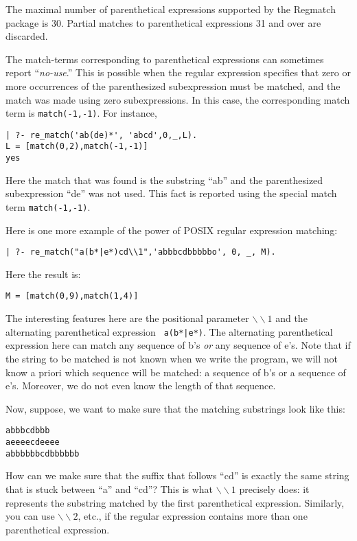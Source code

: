 The maximal number of parenthetical expressions supported by the Regmatch
package is 30. Partial matches to parenthetical expressions 31 and over are
discarded.

The match-terms corresponding to parenthetical expressions can sometimes
report ``\emph{no-use}.'' This is possible when the regular expression
specifies that zero or more occurrences of the parenthesized subexpression
must be matched, and the match was made using zero subexpressions. In this
case, the corresponding match term is \verb|match(-1,-1)|. For instance, 
\begin{verbatim}
| ?- re_match('ab(de)*', 'abcd',0,_,L).
L = [match(0,2),match(-1,-1)]
yes
\end{verbatim}
Here the match that was found is the substring ``ab'' and the parenthesized
subexpression ``de'' was not used. This fact is reported using the special
match term \verb|match(-1,-1)|.

Here is one more example of the power of POSIX regular expression matching:
\begin{verbatim}
| ?- re_match("a(b*|e*)cd\\1",'abbbcdbbbbbo', 0, _, M).  
\end{verbatim}
Here the result is:
\begin{verbatim}
M = [match(0,9),match(1,4)]
\end{verbatim}
The interesting features here are the positional parameter
$\backslash\backslash 1$ and the alternating parenthetical expression {\tt
a(b*|e*)}. The alternating parenthetical expression here can match any
sequence of b's \emph{or} any sequence of e's. Note that if the string to
be matched is not known when we write the program, we will not know a
priori which sequence will be matched: a sequence of b's or a sequence of e's.
Moreover, we do not even know the length of that sequence.

Now, suppose, we want to make sure that the matching substrings look like this:
\begin{verbatim}
abbbcdbbb
aeeeecdeeee
abbbbbbcdbbbbbb
\end{verbatim}
How can we make sure that the suffix that follows ``cd'' is exactly the same
string that is stuck between ``a'' and ``cd''? This is what
$\backslash\backslash 1$ precisely does: it represents the substring
matched by the first parenthetical expression. Similarly, you can use
$\backslash\backslash 2$, etc., if the regular expression contains more
than one parenthetical expression.

